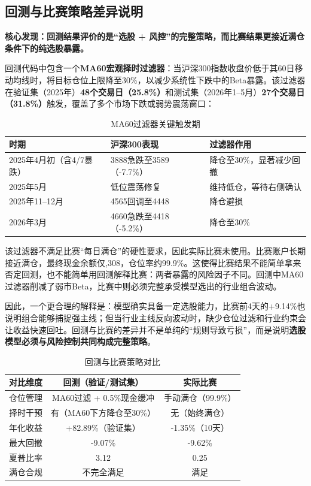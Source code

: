 \documentclass[10pt,a4paper]{ctexart}
\begin{document}
\subsection{回测与比赛策略差异说明}

\textbf{核心发现：回测结果评价的是“选股 + 风控”的完整策略，而比赛结果更接近满仓条件下的纯选股暴露。}

回测代码中包含一个\textbf{MA60宏观择时过滤器}：当沪深300指数收盘价低于其60日移动均线时，将目标仓位上限降至30\%，以减少系统性下跌中的Beta暴露。该过滤器在验证集（2025年）\textbf{48个交易日（25.8\%）}和测试集（2026年1--5月）\textbf{27个交易日（31.8\%）}触发，覆盖了多个市场下跌或弱势震荡窗口：

\begin{table}[htbp]
    \centering
    \caption{MA60过滤器关键触发期}
    \small
    \begin{tabular}{p{4.0cm}p{5.0cm}p{4.8cm}}
        \toprule
        时期 & 沪深300表现 & 过滤器作用 \\
        \midrule
        2025年4月初（含4/7暴跌） & 3888急跌至3589（-7.7\%） & 降仓至30\%，显著减少回撤 \\
        2025年5月 & 低位震荡修复 & 维持低仓，等待右侧确认 \\
        2025年11--12月 & 4565回调至4448 & 降仓避损 \\
        2026年3月 & 4660急跌至4418（-5.2\%） & 降仓至30\% \\
        \bottomrule
    \end{tabular}
\end{table}

该过滤器不满足比赛“每日满仓”的硬性要求，因此实际比赛未使用。比赛账户长期接近满仓，最终现金余额仅,308，仓位率约99.9\%。这使得比赛结果不能简单拿来否定回测，也不能简单用回测解释比赛：两者暴露的风险因子不同。回测中MA60过滤器削减了弱市Beta，比赛中则必须完整承受模型选出的行业组合波动。

因此，一个更合理的解释是：模型确实具备一定选股能力，比赛前4天的+9.14\%也说明组合能够捕捉强主线；但当行业主线反向波动时，缺少仓位过滤和行业约束会让收益快速回吐。回测与比赛的差异并不是单纯的“规则导致亏损”，而是说明\textbf{选股模型必须与风险控制共同构成完整策略}。

\begin{table}[htbp]
    \centering
    \caption{回测与比赛策略对比}
    \begin{tabular}{lcc}
        \toprule
        对比维度 & 回测（验证/测试集） & 实际比赛 \\
        \midrule
        仓位管理 & MA60过滤 + 0.5\%现金缓冲 & 手动满仓（99.9\%） \\
        择时干预 & 有（MA60下方降仓至30\%） & 无（始终满仓） \\
        年化收益 & +82.89\%（验证集） & -1.35\%（10天） \\
        最大回撤 & -9.07\% & -9.62\% \\
        夏普比率 & 3.12 & 0.25 \\
        满仓合规 & 不完全满足 & 满足 \\
        \bottomrule
    \end{tabular}
\end{table}
\end{document}
